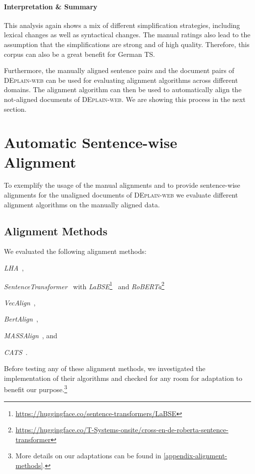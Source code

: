 \documentclass[11pt]{article}
\begin{document}
\paragraph{Interpretation \& Summary}
This analysis again shows a mix of different simplification strategies, including lexical changes as well as syntactical changes. The manual ratings also lead to the assumption that the simplifications are strong and of high quality. Therefore, this corpus can also be a great benefit for German TS. \par

Furthermore, the manually aligned sentence pairs and the document pairs of \textsc{DEplain-web} can be used for evaluating alignment algorithms across different domains. The alignment algorithm can then be used to automatically align the not-aligned documents of \textsc{DEplain-web}. We are showing this process in the next section.



\section{Automatic Sentence-wise Alignment}
To exemplify the usage of the manual alignments and to provide sentence-wise alignments for the unaligned documents of \textsc{DEplain-web} we evaluate different alignment algorithms on the manually aligned data. 


\subsection{Alignment Methods}
We evaluated the following alignment methods:
\begin{enumerate*}[label=\roman*)]
    \item \emph{LHA}~\cite{nikolov-hahnloser-2019-large},
    \item \emph{SentenceTransformer}~\cite{reimers-gurevych-2020-making} with \emph{LaBSE}\footnote{\href{https://huggingface.co/sentence-transformers/LaBSE}{https://huggingface.co/sentence-transformers/LaBSE}}~\cite{feng-etal-2022-language}  and \emph{RoBERTa}\footnote{\href{https://huggingface.co/T-Systems-onsite/cross-en-de-roberta-sentence-transformer}{https://huggingface.co/T-Systems-onsite/cross-en-de-roberta-sentence-transformer}}~\cite{conneau-etal-2020-unsupervised}
    \item \emph{VecAlign}~\cite{thompson-koehn-2020-exploiting},
    \item \emph{BertAlign}~\cite{10.1093/llc/fqac089},
    \item \emph{MASSAlign}~\cite{paetzold-etal-2017-massalign}, and
    \item \emph{CATS}~\cite{stajner-etal-2018-cats}.
\end{enumerate*}
Before testing any of these alignment methods, we investigated the implementation of their algorithms and checked for any room for adaptation to benefit our purpose.\footnote{More details on our adaptations can be found in \autoref{appendix-alignment-methods}.}
\end{document}
